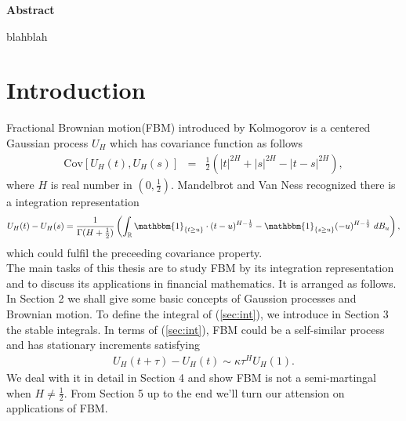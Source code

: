 \documentclass[a4paper, twoside, 11pt]{article}
\theoremstyle{definition}
\newcommand{\brkt}[1]{\left({#1} \right)}
\renewenvironment{abstract}{
	\begin{center}
		  \Large
		  \textbf{Abstract}
		  \hspace{2em}
	\end{center}				
  }{}
\begin{document}
  
  \newpage

  \thispagestyle{empty}
  \begin{abstract}
	blahblah
  \end{abstract}
\newpage

\thispagestyle{empty}
\mbox{}
\newpage
\fancyhead[LO, RE]{}
\fancyfoot[LE, RO]{}
\tableofcontents
\newpage
\thispagestyle{empty}
\mbox{}
\newpage

\fancyhead[RO]{\leftmark}
\fancyhead[LE]{\rightmark}
\fancyfoot[LE, RO]{\large \thepage}
\setcounter{section}{0}
\setcounter{page}{1}
\section{Introduction}
Fractional Brownian motion(FBM) introduced by Kolmogorov is a centered Gaussian process $U_H$ which has covariance function as follows
\begin{eqnarray*}
  \mathrm{Cov}[U_H(t), U_H(s)] &=& \frac{1}{2} (|t|^{2H} + |s|^{2H} - |t-s|^{2H}),
\end{eqnarray*}
where $H$ is real number in $(0, \frac{1}{2})$. Mandelbrot and Van Ness recognized there is a integration representation
\begin{eqnarray}
 	U_H(t) - U_H(s) = \frac{1}{\Gamma(H+\frac{1}{2})}\brkt{\int_{\mathbb{R}} \mathbbm{1}_{\{t\ge u\}}\cdot (t-u)^{H-\frac{1}{2}} - \mathbbm{1}_{\{s\ge u\}} (-u)^{H-\frac{1}{2}} \, \mathop{dB_u}},
	\label{sec:int}
\end{eqnarray}
which could fulfil the preceeding covariance property.\\
The main tasks of this thesis are to study FBM by its integration representation and to discuss its applications in financial mathematics. It is arranged as follows. In Section 2 we shall give some basic concepts of Gaussion processes and Brownian motion. To define the integral of (\ref{sec:int}), we introduce in Section 3 the stable integrals. In terms of (\ref{sec:int}), FBM could be a self-similar process and has stationary increments satisfying
\begin{eqnarray}
  U_H(t+\tau) - U_H(t) \sim \kappa \tau^{H} U_H(1).
  \label{sec:int1}
\end{eqnarray}
We deal with it in detail in Section 4 and show FBM is not a semi-martingal when $H\neq \frac{1}{2}$. From Section 5 up to the end we'll turn our attension on applications of FBM.
\end{document}
